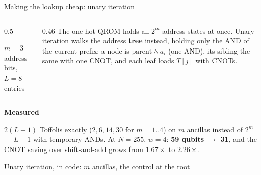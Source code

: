 \documentclass[aspectratio=169,11pt]{beamer}
\newcommand{\peachtitle}[1]{{\bfseries\color{cverm}#1}\par\vskip1mm}
\newcommand{\code}[2][]{}
\begin{document}
\begin{frame}{Making the lookup cheap: unary iteration}
  \begin{columns}[c]
    \begin{column}{0.5\textwidth}
      \centering
      \par
      {\small $m=3$ address bits, $L=8$ entries}
    \end{column}
    \begin{column}{0.46\textwidth}
      The one-hot QROM holds all $2^m$ address states at once. Unary iteration walks the address \textbf{tree} instead, holding only the AND of the current prefix: a node is $\text{parent}\wedge a_i$ (one AND), its sibling the same with one CNOT, and each leaf loads $T[j]$ with CNOTs.
    \end{column}
  \end{columns}
  \begin{peachblock}\peachtitle{Measured}
    $2(L-1)$ Toffolis exactly ($2,6,14,30$ for $m=1..4$) on $m$ ancillas instead of $2^m$ --- $L-1$ with temporary ANDs. At $N=255$, $w=4$: \textbf{59 qubits $\to$ 31}, and the CNOT saving over shift-and-add grows from $1.67\times$ to $2.26\times$.
  \end{peachblock}
\end{frame}

\begin{frame}[fragile]{Unary iteration, in code: $m$ ancillas, the control at the root}
  \code[basicstyle=\ttfamily\fontsize{7.6}{8.8}\selectfont]{lookup_ui.py}
\end{frame}
\end{document}
